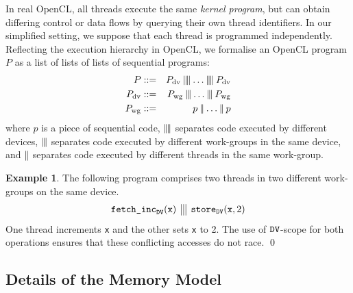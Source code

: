 \documentclass[svgnames,10pt]{sigplanconf}
\theoremstyle{definition}
\newtheorem{example}{Example}
\newenvironment{Example}{\begin{example}}{\qed\end{example}}
\newcommand\pgap{\hspace{-0.1em}}
\renewcommand\parallel{\mathbin{{\mid}\pgap{\mid}}}
\newcommand\tripleparallel{\mathbin{{\mid}\pgap{\mid}\pgap{\mid}}}
\newcommand\quadparallel{\mathbin{{\mid}\pgap{\mid}\pgap{\mid}\pgap{\mid}}}
\newcommand\sdv{{\tt DV}}
\begin{document}
In real OpenCL, all threads execute the same
\emph{kernel program}, but can obtain differing control or data flows
by querying their own thread identifiers. In our simplified setting,
we suppose that each thread is programmed independently. Reflecting
the execution hierarchy in OpenCL, we formalise an
OpenCL program $P$ as a list of lists of lists of sequential programs:
\begin{eqnarray*}
P &::=& P_{\rm dv} \quadparallel \dots \quadparallel P_{\rm dv} \\
P_{\rm dv} &::=& P_{\rm wg} \tripleparallel \dots \tripleparallel P_{\rm
wg} \\
P_{\rm wg} &::=& p \parallel \dots \parallel p 
\end{eqnarray*}
where $p$ is a piece of sequential code, $\quadparallel$ separates
code executed by different devices, $\tripleparallel$ separates code
executed by different work-groups in the
same device, and $\parallel$ separates code executed by different
threads in the same work-group.

\begin{Example} 
\label{ex:rmw_atomicity}
The following program comprises two threads in two different
work-groups on the same device.
\[
\begin{array}{l|||l}
\texttt{fetch\_inc}_\sdv(\texttt{x}) & 
\texttt{store}_\sdv(\texttt{x}, 2)
\end{array}
\]
One thread increments \texttt{x} and the other sets \texttt{x} to
2. The use of $\sdv$-scope for both operations ensures that these
conflicting accesses do not race.
\end{Example}

\subsection{Details of the Memory Model}
\end{document}
